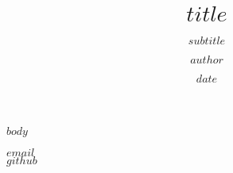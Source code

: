 \documentclass{beamer}
\title{$title$}
\subtitle{$subtitle$}
\author{$author$}
\institute{$university$}
\date{$date$}
\begin{document}
\maketitle
$body$
\begin{frame}[plain]
\begin{center}
  \faEnvelope $email$\\
  \vspace{1cm}
  \faGithub \href{$github$}{$github$}
\end{center}
\end{frame}
\end{document}

